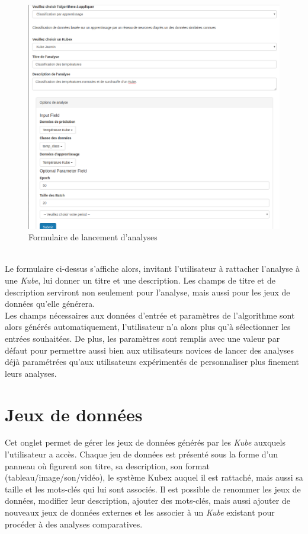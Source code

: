\documentclass[a4paper]{report}
\begin{document}
\begin{figure}[h!]
	\includegraphics[width=\textwidth]{images/pageAnalyse.png}
	\caption{\label{fig:analyse} Formulaire de lancement d'analyses}
\end{figure}
~\\
Le formulaire ci-dessus s'affiche alors, invitant l'utilisateur à rattacher l'analyse à une \emph{Kube}, lui donner un titre et une description. Les champs de titre et de description serviront non seulement pour l'analyse, mais aussi pour les jeux de données qu'elle générera.\\
Les champs nécessaires aux données d'entrée et paramètres de l'algorithme sont alors générés automatiquement, l'utilisateur n'a alors plus qu'à sélectionner les entrées souhaitées. De plus, les paramètres sont remplis avec une valeur par défaut pour permettre aussi bien aux utilisateurs novices de lancer des analyses déjà paramétrées qu'aux utilisateurs expérimentés de personnaliser plus finement leurs analyses.

\newpage
\section{Jeux de données}
\label{sec:datasets}

Cet onglet permet de gérer les jeux de données générés par les \emph{Kube} auxquels l'utilisateur a accès. Chaque jeu de données est présenté sous la forme d'un panneau où figurent son titre, sa description, son format (tableau/image/son/vidéo), le système Kubex auquel il est rattaché, mais aussi sa taille et les mots-clés qui lui sont associés.
Il est possible de renommer les jeux de données, modifier leur description, ajouter des mots-clés, mais aussi ajouter de nouveaux jeux de données externes et les associer à un \emph{Kube} existant pour procéder à des analyses comparatives.
\end{document}
